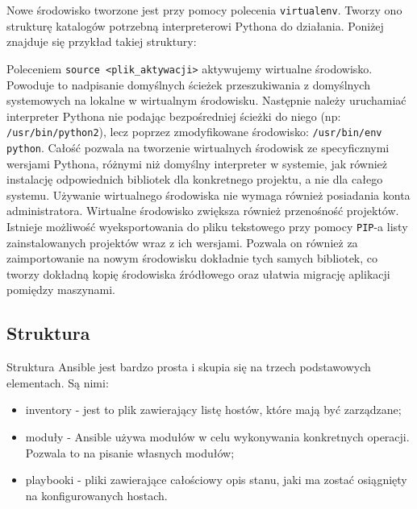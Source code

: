 Nowe środowisko tworzone jest przy pomocy polecenia \texttt{virtualenv}.
Tworzy ono strukturę katalogów potrzebną interpreterowi Pythona do działania. Poniżej znajduje się przykład takiej struktury:

Poleceniem \texttt{source <plik\_aktywacji>} aktywujemy wirtualne środowisko.
Powoduje to nadpisanie domyślnych ścieżek przeszukiwania z domyślnych systemowych na lokalne w wirtualnym środowisku.
Następnie należy uruchamiać interpreter Pythona nie podając bezpośredniej ścieżki do niego (np: \texttt{/usr/bin/python2}), lecz poprzez zmodyfikowane środowisko: \texttt{/usr/bin/env python}.
Całość pozwala na tworzenie wirtualnych środowisk ze specyficznymi wersjami Pythona, różnymi niż domyślny interpreter w systemie, jak również instalację odpowiednich bibliotek dla konkretnego projektu, a nie dla całego systemu.
Używanie wirtualnego środowiska nie wymaga również posiadania konta administratora.  
Wirtualne środowisko zwiększa również przenośność projektów.
Istnieje możliwość wyeksportowania do pliku tekstowego przy pomocy \texttt{PIP}-a listy zainstalowanych projektów wraz z ich wersjami.
Pozwala on również za zaimportowanie na nowym środowisku dokładnie tych samych bibliotek, co tworzy dokładną kopię środowiska źródłowego oraz ułatwia migrację aplikacji pomiędzy maszynami.
\subsection{Struktura}
Struktura Ansible jest bardzo prosta i skupia się na trzech podstawowych elementach. Są nimi:
\begin{itemize}
\item {inventory} - jest to plik zawierający listę hostów, które mają być zarządzane;
\item {moduły} - Ansible używa modułów w celu wykonywania konkretnych operacji. Pozwala to na pisanie własnych modułów;
\item {playbooki} - pliki zawierające całościowy opis stanu, jaki ma zostać osiągnięty na konfigurowanych hostach.
\end{itemize}

